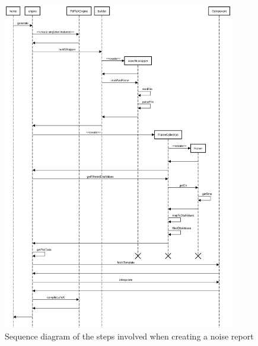 \begin{figure}[H]
    \centering
    \includegraphics[width=0.9\textwidth]{../assets/sequence_diagram_from_wave_file_to_pdf.png}
    \caption{Sequence diagram of the steps involved when creating a noise report}\label{fig:sequence-diagram-noise-report}
\end{figure}

